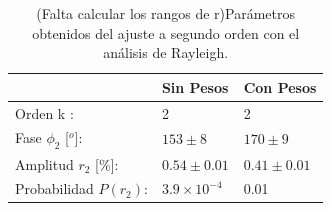 		\begin{table}[H]
		\centering
			\begin{tabular}{l|l|l|}
			\cline{2-3}
			                                      			& Sin Pesos 		 & Con Pesos \\ \hline
			\multicolumn{1}{|l|}{Orden k :}       			& 2                & 2                    \\ \hline
			\multicolumn{1}{|l|}{Fase $\phi_2$ [$^o$]:}  	& $153\pm8$    & $170\pm9$                   \\ \hline
			\multicolumn{1}{|l|}{Amplitud $r_2$ [\%]:} 		& $0.54\pm0.01$& $0.41\pm0.01$               \\ \hline
			\multicolumn{1}{|l|}{Probabilidad $P(r_2)$:}    & $3.9\times 10^{-4}$\        & 0.01  \\ \hline
			\end{tabular}
		\caption{(Falta calcular los rangos de r)Parámetros obtenidos del ajuste a segundo orden con el análisis de Rayleigh.}
		\label{table:parametros_second_order}
		\end{table}
